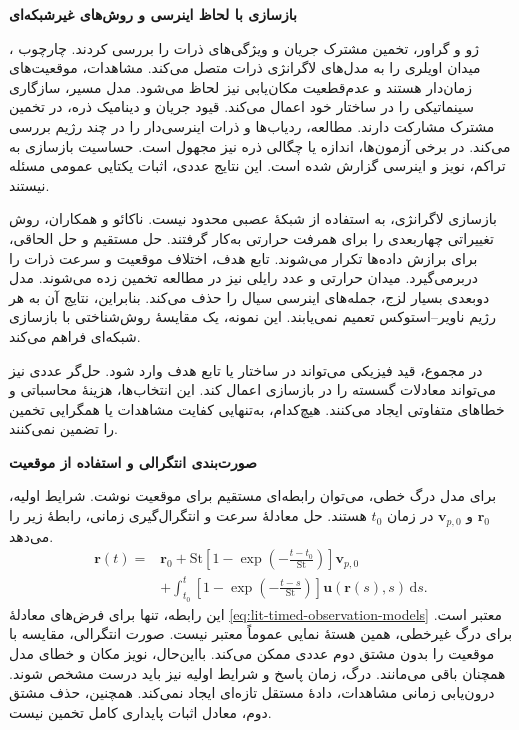 \textbf{بازسازی با لحاظ اینرسی و روش‌های غیرشبکه‌ای}

ژو و گراور، تخمین مشترک جریان و ویژگی‌های ذرات را بررسی کردند.
چارچوب ، میدان اویلری را به مدل‌های لاگرانژی ذرات متصل می‌کند.
مشاهدات، موقعیت‌های زمان‌دار هستند و عدم‌قطعیت مکان‌یابی نیز لحاظ می‌شود.
مدل مسیر، سازگاری سینماتیکی را در ساختار خود اعمال می‌کند.
قیود جریان و دینامیک ذره، در تخمین مشترک مشارکت دارند.
مطالعه، ردیاب‌ها و ذرات اینرسی‌دار را در چند رژیم بررسی می‌کند.
در برخی آزمون‌ها، اندازه یا چگالی ذره نیز مجهول است.
حساسیت بازسازی به تراکم، نویز و اینرسی گزارش شده است.
این نتایج عددی، اثبات یکتایی عمومی مسئله نیستند.
\cite{ZhouGrauer2026Joint}

بازسازی لاگرانژی، به استفاده از شبکهٔ عصبی محدود نیست.
ناکائو و همکاران، روش تغییراتی چهاربعدی را برای همرفت حرارتی به‌کار گرفتند.
حل مستقیم و حل الحاقی، برای برازش داده‌ها تکرار می‌شوند.
تابع هدف، اختلاف موقعیت و سرعت ذرات را دربرمی‌گیرد.
میدان حرارتی و عدد رایلی نیز در مطالعه تخمین زده می‌شوند.
مدل دوبعدی بسیار لزج، جمله‌های اینرسی سیال را حذف می‌کند.
بنابراین، نتایج آن به هر رژیم ناویر–استوکس تعمیم نمی‌یابند.
این نمونه، یک مقایسهٔ روش‌شناختی با بازسازی شبکه‌ای فراهم می‌کند.
\cite{Nakao2025LagrangianDA}

در مجموع، قید فیزیکی می‌تواند در ساختار یا تابع هدف وارد شود.
حل‌گر عددی نیز می‌تواند معادلات گسسته را در بازسازی اعمال کند.
این انتخاب‌ها، هزینهٔ محاسباتی و خطاهای متفاوتی ایجاد می‌کنند.
هیچ‌کدام، به‌تنهایی کفایت مشاهدات یا همگرایی تخمین را تضمین نمی‌کنند.

\textbf{صورت‌بندی انتگرالی و استفاده از موقعیت}

برای مدل درگ خطی، می‌توان رابطه‌ای مستقیم برای موقعیت نوشت.
شرایط اولیه، $\mathbf r_0$ و $\mathbf v_{p,0}$ در زمان $t_0$ هستند.
حل معادلهٔ سرعت و انتگرال‌گیری زمانی، رابطهٔ زیر را می‌دهد.
\begin{equation}
\begin{aligned}
\mathbf r(t)={}&\mathbf r_0
+\mathrm{St}\left[1-\exp\!\left(-\frac{t-t_0}{\mathrm{St}}\right)\right]
\mathbf v_{p,0}\\
&+\int_{t_0}^{t}
\left[1-\exp\!\left(-\frac{t-s}{\mathrm{St}}\right)\right]
\mathbf u(\mathbf r(s),s)\,\mathrm ds.
\end{aligned}
\label{eq:lit-timed-integral-position}
\end{equation}
این رابطه، تنها برای فرض‌های معادلهٔ \ref{eq:lit-timed-observation-models} معتبر است.
برای درگ غیرخطی، همین هستهٔ نمایی عموماً معتبر نیست.
صورت انتگرالی، مقایسه با موقعیت را بدون مشتق دوم عددی ممکن می‌کند.
بااین‌حال، نویز مکان و خطای مدل همچنان باقی می‌مانند.
درگ، زمان پاسخ و شرایط اولیه نیز باید درست مشخص شوند.
درون‌یابی زمانی مشاهدات، دادهٔ مستقل تازه‌ای ایجاد نمی‌کند.
همچنین، حذف مشتق دوم، معادل اثبات پایداری کامل تخمین نیست.


